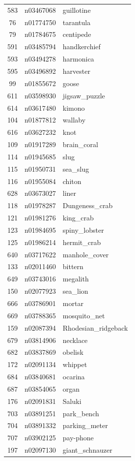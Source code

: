\begin{table}
\begin{tabular}{cll}
583 & n03467068 & guillotine \\
76 & n01774750 & tarantula \\
79 & n01784675 & centipede \\
591 & n03485794 & handkerchief \\
593 & n03494278 & harmonica \\
595 & n03496892 & harvester \\
99 & n01855672 & goose \\
611 & n03598930 & jigsaw_puzzle \\
614 & n03617480 & kimono \\
104 & n01877812 & wallaby \\
616 & n03627232 & knot \\
109 & n01917289 & brain_coral \\
114 & n01945685 & slug \\
115 & n01950731 & sea_slug \\
116 & n01955084 & chiton \\
628 & n03673027 & liner \\
118 & n01978287 & Dungeness_crab \\
121 & n01981276 & king_crab \\
123 & n01984695 & spiny_lobster \\
125 & n01986214 & hermit_crab \\
640 & n03717622 & manhole_cover \\
133 & n02011460 & bittern \\
649 & n03743016 & megalith \\
150 & n02077923 & sea_lion \\
666 & n03786901 & mortar \\
669 & n03788365 & mosquito_net \\
159 & n02087394 & Rhodesian_ridgeback \\
679 & n03814906 & necklace \\
682 & n03837869 & obelisk \\
172 & n02091134 & whippet \\
684 & n03840681 & ocarina \\
687 & n03854065 & organ \\
176 & n02091831 & Saluki \\
703 & n03891251 & park_bench \\
704 & n03891332 & parking_meter \\
707 & n03902125 & pay-phone \\
197 & n02097130 & giant_schnauzer \\

\end{tabular}
\end{table}
